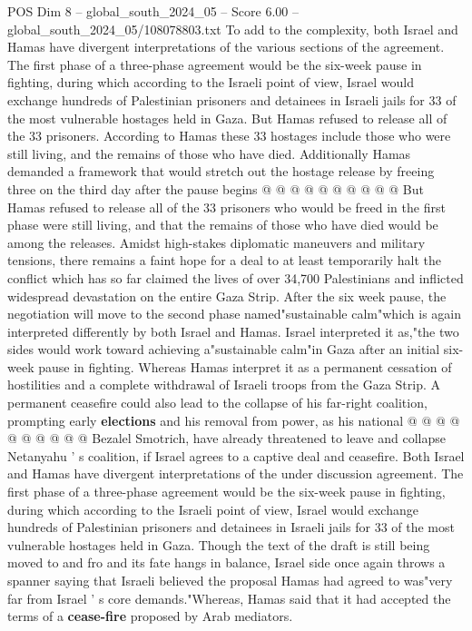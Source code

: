 \begin{textsample}{POS Dim 8 – global\_south\_2024\_05 – Score 6.00 – global\_south\_2024\_05/108078803.txt}
To add to the complexity, both Israel and Hamas have divergent interpretations of the various sections of the agreement.
The first phase of a three-phase agreement would be the six-week pause in fighting, during which according to the Israeli point of view, Israel would exchange hundreds of Palestinian prisoners and detainees in Israeli jails for 33 of the most vulnerable hostages held in Gaza.
But Hamas refused to release all of the 33 prisoners.
According to Hamas these 33 hostages include those who were still living, and the remains of those who have died.
Additionally Hamas demanded a framework that would stretch out the hostage release by freeing three on the third day after the pause begins @ @ @ @ @ @ @ @ @ @ But Hamas refused to release all of the 33 prisoners who would be freed in the first phase were still living, and that the remains of those who have died would be among the releases.
Amidst high-stakes diplomatic maneuvers and military tensions, there remains a faint hope for a deal to at least temporarily halt the conflict which has so far claimed the lives of over 34,700 Palestinians and inflicted widespread devastation on the entire Gaza Strip.
After the six week pause, the negotiation will move to the second phase named"sustainable calm"which is again interpreted differently by both Israel and Hamas.
Israel interpreted it as,"the two sides would work toward achieving a"sustainable calm"in Gaza after an initial six-week pause in fighting.
Whereas Hamas interpret it as a permanent cessation of hostilities and a complete withdrawal of Israeli troops from the Gaza Strip.
A permanent ceasefire could also lead to the collapse of his far-right coalition, prompting early \textbf{elections} and his removal from power, as his national @ @ @ @ @ @ @ @ @ @ Bezalel Smotrich, have already threatened to leave and collapse Netanyahu ' s coalition, if Israel agrees to a captive deal and ceasefire.
Both Israel and Hamas have divergent interpretations of the under discussion agreement.
The first phase of a three-phase agreement would be the six-week pause in fighting, during which according to the Israeli point of view, Israel would exchange hundreds of Palestinian prisoners and detainees in Israeli jails for 33 of the most vulnerable hostages held in Gaza.
Though the text of the draft is still being moved to and fro and its fate hangs in balance, Israel side once again throws a spanner saying that Israeli believed the proposal Hamas had agreed to was"very far from Israel ' s core demands."Whereas, Hamas said that it had accepted the terms of a \textbf{cease-fire} proposed by Arab mediators.

\end{textsample}
